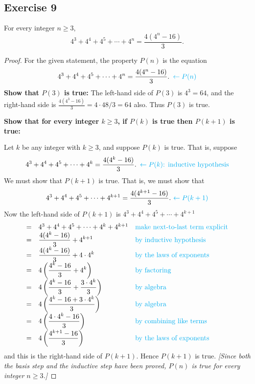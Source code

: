 \documentclass[14pt]{extarticle}
\newcommand{\dps}{\displaystyle}
\newcommand{\from}{\leftarrow}
\newcommand{\cy}{\color{cyan}}
\begin{document}
\subsection{Exercise 9}
For every integer $n \geq 3$,
\[
4^3 + 4^4 + 4^5 + \cdots + 4^n = \frac{4(4^n-16)}{3}.
\]
\begin{proof}
For the given statement, the property $P(n)$ is the equation
\[
4^3 + 4^4 + 4^5 + \cdots + 4^n = \frac{4(4^n-16)}{3}. \,\,\, {\cy \from P(n)}
\]
{\bf Show that $P(3)$ is true:} The left-hand side of $P(3)$ is $4^3 = 64$, and the right-hand side is $\frac{4(4^3-16)}{3} = 4 \cdot 48 / 3 = 64$ also. Thus $P(3)$ is true.

{\bf Show that for every integer $k \geq 3$, if $P(k)$ is true then $P(k + 1)$ is true:}

Let $k$ be any integer with $k \geq 3$, and suppose $P(k)$ is true. That is, suppose
\[
4^3 + 4^4 + 4^5 + \cdots + 4^k = \frac{4(4^k-16)}{3}. \,\,\, {\cy \from P(k) \text{: inductive hypothesis}}
\]
We must show that $P(k + 1)$ is true. That is, we must show that
\[
4^3 + 4^4 + 4^5 + \cdots + 4^{k+1} = \frac{4(4^{k+1}-16)}{3}. \,\, {\cy \from P(k+1)}
\]
Now the left-hand side of $P(k + 1)$ is $4^3 + 4^4 + 4^5 + \cdots + 4^{k+1}$
\[
\begin{array}{lll}
= & 4^3 + 4^4 + 4^5 + \cdots + 4^k + 4^{k+1} & \text{\cy make next-to-last term explicit} \\
= & \dps \frac{4(4^k-16)}{3} + 4^{k+1} & \text{\cy by inductive hypothesis} \\
= & \dps \frac{4(4^k-16)}{3} + 4 \cdot 4^k & \text{\cy by the laws of exponents} \\
= & \dps 4\left(\frac{4^k-16}{3} + 4^k \right) & \text{\cy by factoring} \\
= & \dps 4\left(\frac{4^k-16}{3} + \frac{3 \cdot 4^k}{3}\right) & \text{\cy by algebra} \\
= & \dps 4\left(\frac{4^k-16 + 3 \cdot 4^k}{3}\right) & \text{\cy by algebra} \\
= & \dps 4\left(\frac{4 \cdot 4^k-16}{3}\right) & \text{\cy by combining like terms} \\
= & \dps 4\left(\frac{4^{k+1}-16}{3}\right) & \text{\cy by the laws of exponents} 
\end{array}
\]
and this is the right-hand side of $P(k + 1)$. Hence $P(k + 1)$ is true. {\it [Since both the basis step and the inductive step have been proved, $P(n)$ is true for every integer $n \geq 3$.]}
\end{proof}
\end{document}
